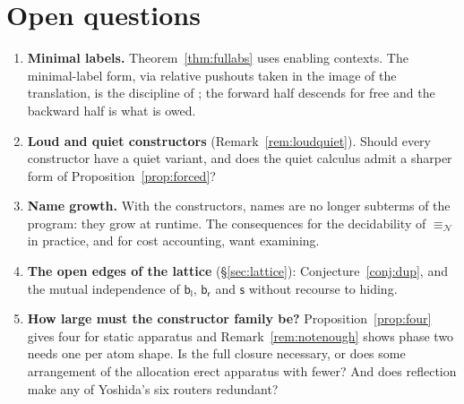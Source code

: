 \documentclass[11pt]{article}
\theoremstyle{plain}
\theoremstyle{definition}
\theoremstyle{remark}
\newcommand{\nequiv}{\equiv_{\mathcal{N}}}
\newcommand{\bl}{\mathsf{b}_{\mathsf{l}}}
\newcommand{\br}{\mathsf{b}_{\mathsf{r}}}
\newcommand{\sy}{\mathsf{s}}
\begin{document}
\section{Open questions}

\begin{enumerate}[leftmargin=1.6em]
\item \textbf{Minimal labels.} Theorem~\ref{thm:fullabs} uses enabling
contexts. The minimal-label form, via relative pushouts taken in the image of
the translation, is the discipline of \cite{BIHOL}; the forward half descends
for free and the backward half is what is owed.

\item \textbf{Loud and quiet constructors} (Remark~\ref{rem:loudquiet}).
Should every constructor have a quiet variant, and does the quiet calculus
admit a sharper form of Proposition~\ref{prop:forced}?

\item \textbf{Name growth.} With the constructors, names are no longer subterms of the
program: they grow at runtime. The consequences for the decidability of
$\nequiv$ in practice, and for cost accounting, want examining.

\item \textbf{The open edges of the lattice} (\S\ref{sec:lattice}):
Conjecture~\ref{conj:dup}, and the mutual independence of $\bl$, $\br$ and
$\sy$ without recourse to hiding.

\item \textbf{How large must the constructor family be?}
Proposition~\ref{prop:four} gives four for static apparatus and
Remark~\ref{rem:notenough} shows phase two needs one per atom shape. Is the
full closure necessary, or does some arrangement of the allocation erect
apparatus with fewer? And does reflection make any of Yoshida's six routers
redundant?
\end{enumerate}
\end{document}
